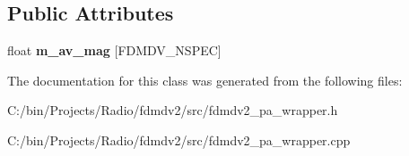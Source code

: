 \subsection*{Public Attributes}
\begin{DoxyCompactItemize}
\item 
\hypertarget{class_port_audio_wrap_ad9da60946a4fec855cce07c1e497d7be}{float {\bfseries m\-\_\-av\-\_\-mag} \mbox{[}F\-D\-M\-D\-V\-\_\-\-N\-S\-P\-E\-C\mbox{]}}\label{class_port_audio_wrap_ad9da60946a4fec855cce07c1e497d7be}

\end{DoxyCompactItemize}


The documentation for this class was generated from the following files\-:\begin{DoxyCompactItemize}
\item 
C\-:/bin/\-Projects/\-Radio/fdmdv2/src/fdmdv2\-\_\-pa\-\_\-wrapper.\-h\item 
C\-:/bin/\-Projects/\-Radio/fdmdv2/src/fdmdv2\-\_\-pa\-\_\-wrapper.\-cpp\end{DoxyCompactItemize}
